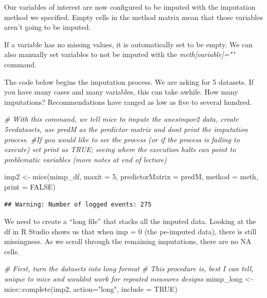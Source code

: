 \documentclass[
  english,
]{book}
\newenvironment{Shaded}{\begin{snugshade}}{\end{snugshade}}
\newcommand{\AttributeTok}[1]{\textcolor[rgb]{0.77,0.63,0.00}{#1}}
\newcommand{\CommentTok}[1]{\textcolor[rgb]{0.56,0.35,0.01}{\textit{#1}}}
\newcommand{\ConstantTok}[1]{\textcolor[rgb]{0.00,0.00,0.00}{#1}}
\newcommand{\DecValTok}[1]{\textcolor[rgb]{0.00,0.00,0.81}{#1}}
\newcommand{\FunctionTok}[1]{\textcolor[rgb]{0.00,0.00,0.00}{#1}}
\newcommand{\NormalTok}[1]{#1}
\newcommand{\OtherTok}[1]{\textcolor[rgb]{0.56,0.35,0.01}{#1}}
\newcommand{\SpecialCharTok}[1]{\textcolor[rgb]{0.00,0.00,0.00}{#1}}
\newcommand{\StringTok}[1]{\textcolor[rgb]{0.31,0.60,0.02}{#1}}
\begin{document}
Our variables of interest are now configured to be imputed with the imputation method we specified. Empty cells in the method matrix mean that those variables aren't going to be imputed.

If a variable has no missing values, it is automatically set to be empty. We can also manually set variables to not be imputed with the \emph{meth{[}variable{]}=""} command.

The code below begins the imputation process. We are asking for 5 datasets. If you have many cases and many variables, this can take awhile. How many imputations? Recommendations have ranged as low as five to several hundred.

\begin{Shaded}
\begin{Highlighting}[]
\CommentTok{\# With this command, we tell mice to impute the anesimpor2 data, create 5vvdatasets, use predM as the predictor matrix and don\textquotesingle{}t print the imputation process. }
\CommentTok{\#If you would like to see the process (or if the process is failing to execute) set print as TRUE; seeing where the execution halts can point to problematic variables (more notes at end of lecture)}

\NormalTok{imp2 }\OtherTok{\textless{}{-}} \FunctionTok{mice}\NormalTok{(mimp\_df, }\AttributeTok{maxit =} \DecValTok{5}\NormalTok{, }
             \AttributeTok{predictorMatrix =}\NormalTok{ predM, }
             \AttributeTok{method =}\NormalTok{ meth, }\AttributeTok{print =}  \ConstantTok{FALSE}\NormalTok{)}
\end{Highlighting}
\end{Shaded}

\begin{verbatim}
## Warning: Number of logged events: 275
\end{verbatim}

We need to create a ``long file'' that stacks all the imputed data. Looking at the df in R Studio shows us that when imp = 0 (the pe-imputed data), there is still missingness. As we scroll through the remaining imputations, there are no NA cells.

\begin{Shaded}
\begin{Highlighting}[]
\CommentTok{\# First, turn the datasets into long format}
\CommentTok{\# This procedure is, best I can tell, unique to mice and wouldn\textquotesingle{}t work for repeated measures designs}
\NormalTok{mimp\_long }\OtherTok{\textless{}{-}}\NormalTok{ mice}\SpecialCharTok{::}\FunctionTok{complete}\NormalTok{(imp2, }\AttributeTok{action=}\StringTok{"long"}\NormalTok{, }\AttributeTok{include =} \ConstantTok{TRUE}\NormalTok{)}
\end{Highlighting}
\end{Shaded}
\end{document}
